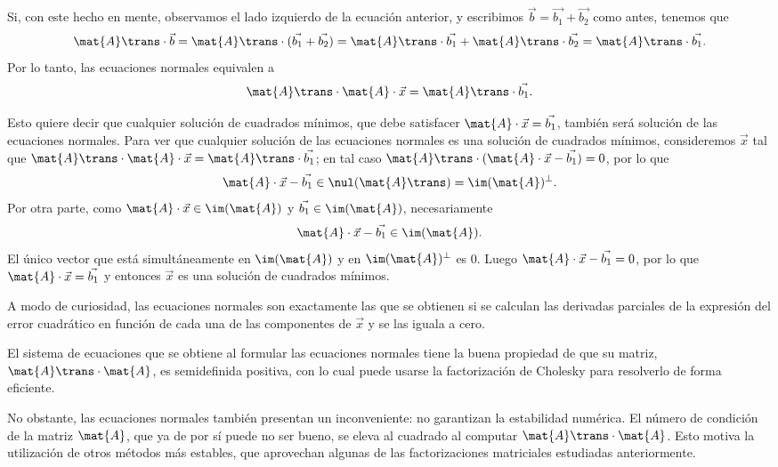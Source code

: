 Si, con este hecho en mente, observamos el lado izquierdo de la ecuación
anterior, y escribimos $\vec{b} = \vec{b_1} + \vec{b_2}$
como antes, tenemos que 
\[ \mat{A}\trans \cdot \vec{b}
    = \mat{A}\trans \cdot (\vec{b_1} + \vec{b_2})
    = \mat{A}\trans \cdot \vec{b_1} + \mat{A}\trans \cdot \vec{b_2}
    = \mat{A}\trans \cdot \vec{b_1}. \]
Por lo tanto, las ecuaciones normales equivalen a 
\[ \mat{A}\trans \cdot \mat{A} \cdot \vec{x} = \mat{A}\trans \cdot \vec{b_1}. \]

Esto quiere decir que cualquier solución de cuadrados mínimos, que debe
satisfacer $\mat{A} \cdot \vec{x} = \vec{b_1}$, también será solución de las
ecuaciones normales. Para ver que cualquier solución de las
ecuaciones normales es una solución de cuadrados mínimos, consideremos
$\vec{x}$ tal que $\mat{A}\trans \cdot \mat{A} \cdot \vec{x} = \mat{A}\trans \cdot \vec{b_1}$; en tal caso $\mat{A}\trans \cdot (\mat{A} \cdot \vec{x} -
\vec{b_1}) = 0$, por lo que
\[ \mat{A} \cdot \vec{x} - \vec{b_1} \in \nul(\mat{A}\trans) =
    \im(\mat{A})^{\bot}. \]
Por otra parte, como $\mat{A} \cdot \vec{x} \in \im(\mat{A})$ y
$\vec{b_1} \in \im(\mat{A})$, necesariamente
\[ \mat{A} \cdot \vec{x} - \vec{b_1} \in \im(\mat{A}). \]
El único vector que está simultáneamente en $\im(\mat{A})$ y en
$\im(\mat{A})^{\bot}$ es $0$. Luego $\mat{A} \cdot \vec{x} - \vec{b_1} = 0$,
por lo que $\mat{A} \cdot \vec{x} = \vec{b_1}$ y entonces $\vec{x}$ es una
solución de cuadrados mínimos.

A modo de curiosidad, las ecuaciones normales son exactamente las que se
obtienen si se calculan las derivadas parciales de la expresión del error
cuadrático en función de cada una de las componentes de $\vec{x}$ y se las
iguala a cero.

El sistema de ecuaciones que se obtiene al formular las ecuaciones normales
tiene la buena propiedad de que su matriz, $\mat{A}\trans \cdot \mat{A}$,
es semidefinida positiva, con lo cual puede usarse la factorización de
Cholesky para resolverlo de forma eficiente.

No obstante, las ecuaciones normales también presentan un inconveniente: no garantizan la estabilidad numérica.
El número de condición de la matriz $\mat{A}$, que ya de por sí puede no ser
bueno, se eleva al cuadrado al computar $\mat{A}\trans \cdot \mat{A}$.
Esto motiva la utilización de otros métodos más estables, que aprovechan
algunas de las factorizaciones matriciales estudiadas anteriormente.

